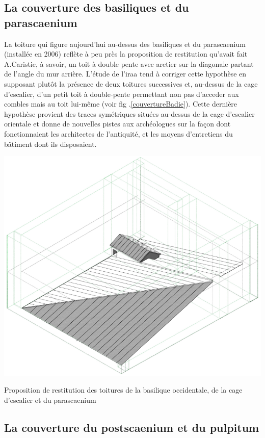 	\subsection{La couverture des \glspl{basilique} et du \gls{parascaenium}}
	\label{couverture-basi}
		
		La toiture qui figure aujourd'hui au-dessus des \glspl{basilique} et du \gls{parascaenium} (installée en 2006) reflète à peu près la proposition de restitution qu'avait fait A.Caristie, à savoir, un toit à double pente avec \gls{aretier} sur la diagonale partant de l'angle du mur arrière. L'étude de l'\gls{iraa} tend à corriger cette hypothèse en supposant plutôt la présence de deux toitures successives et, au-dessus de la cage d’escalier, d’un petit toit à double-pente permettant non pas d’acceder aux combles mais au toit lui-même (voir fig .\ref{couvertureBadie}). Cette dernière hypothèse provient des traces symétriques situées au-dessus de la cage d’escalier orientale et donne de nouvelles pistes aux archéologues sur la façon dont fonctionnaient les architectes de l'antiquité, et les moyens d'entretiens du bâtiment dont ils disposaient. 
		
		\begin{figureth}
			\includegraphics[width=0.7\linewidth]{images/couvertureBadie}
			\caption[Toitures de basiliques par A.Badie]{Proposition de restitution des toitures de la \gls{basilique} occidentale, de la cage d'escalier et du \gls{parascaenium} \footnotemark}
			\label{couvertureBadie}
		\end{figureth}	
		
		\subsection{La couverture du \gls{postscaenium} et du \gls{pulpitum}} \label{couverture}
		
